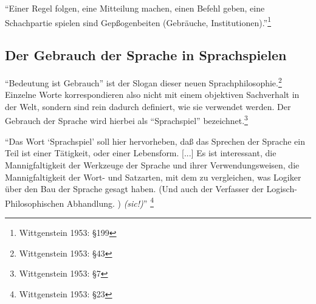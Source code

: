 \documentclass[10pt,a4paper]{article}
\begin{document}
\begin{displayquote}
\enquote{Einer Regel folgen, eine Mitteilung machen, einen Befehl geben, eine Schachpartie spielen sind Gepßogenbeiten (Gebräuche, Institutionen).}\footnote{Wittgenstein 1953: §199}
\end{displayquote}


\subsection{Der Gebrauch der Sprache in Sprachspielen}
\enquote{Bedeutung ist Gebrauch} ist der Slogan dieser neuen Sprachphilosophie.\footnote{Wittgenstein 1953: §43} Einzelne Worte korrespondieren also nicht mit einem objektiven Sachverhalt in der Welt, sondern sind rein dadurch definiert, wie sie verwendet werden. Der Gebrauch der Sprache wird hierbei als \enquote{Sprachspiel} bezeichnet.\footnote{Wittgenstein 1953: §7}

\begin{displayquote}
\enquote{Das Wort \enquote{Sprachspiel} soll hier hervorheben, daß das Sprechen
der Sprache ein Teil ist einer Tätigkeit, oder einer Lebensform. [...]
Es ist interessant, die Mannigfaltigkeit der Werkzeuge der Sprache
und ihrer Verwendungsweisen, die Mannigfaltigkeit der Wort- und
Satzarten, mit dem zu vergleichen, was Logiker über den Bau der
Sprache gesagt haben. (Und auch der Verfasser der Logisch-Philosophischen Abhandlung. ) \textit{(sic!)}} \footnote{Wittgenstein 1953: §23}
\end{displayquote}
\end{document}
